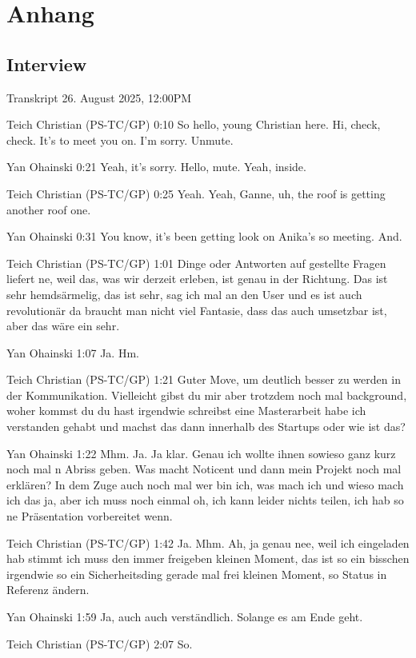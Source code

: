 \chapter{Anhang}
\section{Interview}
\label{app:interview}
Transkript
26. August 2025, 12:00PM

Teich Christian (PS-TC/GP)   0:10
So hello, young Christian here. Hi, check, check. It's to meet you on. I'm sorry.
Unmute.

Yan Ohainski   0:21
Yeah, it's sorry. Hello, mute. Yeah, inside.

Teich Christian (PS-TC/GP)   0:25
Yeah.
Yeah, Ganne, uh, the roof is getting another roof one.

Yan Ohainski   0:31
You know, it's been getting look on Anika's so meeting.
And.

Teich Christian (PS-TC/GP)   1:01
Dinge oder Antworten auf gestellte Fragen liefert ne, weil das, was wir derzeit erleben, ist genau in der Richtung. Das ist sehr hemdsärmelig, das ist sehr, sag ich mal an den User und es ist auch revolutionär da braucht man nicht viel Fantasie, dass das auch umsetzbar ist, aber das wäre ein sehr.

Yan Ohainski   1:07
Ja.
Hm.

Teich Christian (PS-TC/GP)   1:21
Guter Move, um deutlich besser zu werden in der Kommunikation. Vielleicht gibst du mir aber trotzdem noch mal background, woher kommst du du hast irgendwie schreibst eine Masterarbeit habe ich verstanden gehabt und machst das dann innerhalb des Startups oder wie ist das?

Yan Ohainski   1:22
Mhm.
Ja.
Ja klar.
Genau ich wollte ihnen sowieso ganz kurz noch mal n Abriss geben. Was macht Noticent und dann mein Projekt noch mal erklären? In dem Zuge auch noch mal wer bin ich, was mach ich und wieso mach ich das ja, aber ich muss noch einmal oh, ich kann leider nichts teilen, ich hab so ne Präsentation vorbereitet wenn.

Teich Christian (PS-TC/GP)   1:42
Ja.
Mhm.
Ah, ja genau nee, weil ich eingeladen hab stimmt ich muss den immer freigeben kleinen Moment, das ist so ein bisschen irgendwie so ein Sicherheitsding gerade mal frei kleinen Moment, so Status in Referenz ändern.

Yan Ohainski   1:59
Ja, auch auch verständlich.
Solange es am Ende geht.

Teich Christian (PS-TC/GP)   2:07
So.

